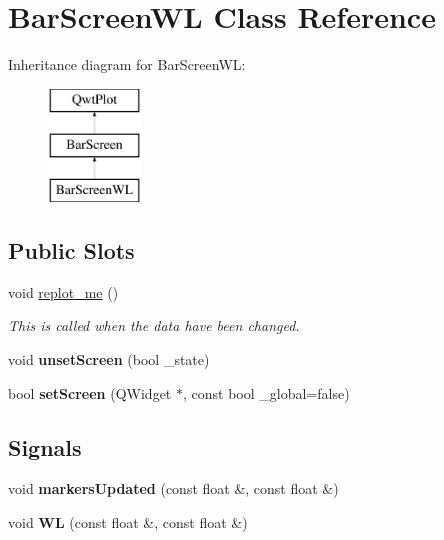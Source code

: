 \hypertarget{classBarScreenWL}{}\section{Bar\+Screen\+WL Class Reference}
\label{classBarScreenWL}
Inheritance diagram for Bar\+Screen\+WL\+:\begin{figure}[H]
\begin{center}
\leavevmode
\includegraphics[height=3.000000cm]{classBarScreenWL}
\end{center}
\end{figure}
\subsection*{Public Slots}
\begin{DoxyCompactItemize}
\item 
\mbox{\label{classBarScreenWL_afe0474598cdfc4ed117c6f7300a90a92}} 
void \mbox{\hyperlink{classBarScreenWL_afe0474598cdfc4ed117c6f7300a90a92}{replot\+\_\+me}} ()
\begin{DoxyCompactList}\small\item\em This is called when the data have been changed. \end{DoxyCompactList}\item 
\mbox{\label{classBarScreen_a73d64473bee2dceb5e14f6ecd9085c5a}} 
void {\bfseries unset\+Screen} (bool \+\_\+state)
\item 
\mbox{\label{classBarScreen_a584ecbf24a178b74fee22eb40e6281de}} 
bool {\bfseries set\+Screen} (Q\+Widget $\ast$, const bool \+\_\+global=false)
\end{DoxyCompactItemize}
\subsection*{Signals}
\begin{DoxyCompactItemize}
\item 
\mbox{\label{classBarScreen_a39dadd115d8012630aac2ff7cb188fa6}} 
void {\bfseries markers\+Updated} (const float \&, const float \&)
\item 
\mbox{\label{classBarScreen_a3251fb8903f71f8ea0df00d17b7302cf}} 
void {\bfseries WL} (const float \&, const float \&)
\end{DoxyCompactItemize}
